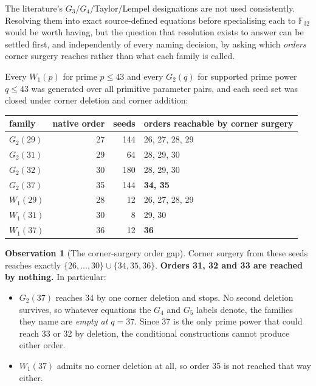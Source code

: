 \documentclass[11pt,a4paper,oneside]{report}
\theoremstyle{definition}
\newtheorem{observation}[theorem]{Observation}
\newcommand{\F}{\mathbb{F}}
\begin{document}
The literature's $G_3$/$G_4$/Taylor/Lempel designations are not used consistently. Resolving them into exact source-defined equations before specialising each to $\F_{32}$ would be worth having, but the question that resolution exists to answer
can be settled first, and independently of every naming decision, by asking which
\emph{orders} corner surgery reaches rather than what each family is called.

Every $W_1(p)$ for prime $p\le43$ and every $G_2(q)$ for supported prime power
$q\le43$ was generated over all primitive parameter pairs, and each seed set was
closed under corner deletion and corner addition:

\begin{center}
\begin{tabular}{@{}lrrl@{}}
\toprule
family & native order & seeds & orders reachable by corner surgery \\
\midrule
$G_2(29)$ & 27 & 144 & 26, 27, 28, 29 \\
$G_2(31)$ & 29 & 64 & 28, 29, 30 \\
$G_2(32)$ & 30 & 180 & 28, 29, 30 \\
$G_2(37)$ & 35 & 144 & \textbf{34, 35} \\
$W_1(29)$ & 28 & 12 & 26, 27, 28, 29 \\
$W_1(31)$ & 30 & 8 & 29, 30 \\
$W_1(37)$ & 36 & 12 & \textbf{36} \\
\bottomrule
\end{tabular}
\end{center}

\begin{observation}[The corner-surgery order gap]
\label{p1-obs:ordergap}
Corner surgery from these seeds reaches exactly
$\{26,\dots,30\}\cup\{34,35,36\}$. \textbf{Orders 31, 32 and 33 are reached by
nothing.} In particular:
\begin{itemize}
\item $G_2(37)$ reaches 34 by one corner deletion and stops. No second deletion
  survives, so whatever equations the $G_4$ and $G_5$ labels denote, the families
  they name are \emph{empty at $q=37$}. Since 37 is the only prime power that
  could reach 33 or 32 by deletion, the conditional constructions cannot produce
  either order.
\item $W_1(37)$ admits no corner deletion at all, so order 35 is not reached that
  way either.
\end{itemize}
\end{observation}
\end{document}
